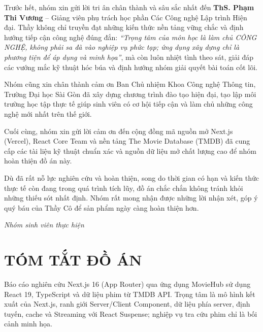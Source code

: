 \documentclass[12pt,a4paper]{extarticle}
\begin{document}
Trước hết, nhóm xin gửi lời tri ân chân thành và sâu sắc nhất đến \textbf{ThS. Phạm Thi Vương} -- Giảng viên phụ trách học phần Các Công nghệ Lập trình Hiện đại. Thầy không chỉ truyền đạt những kiến thức nền tảng vững chắc và định hướng tiếp cận công nghệ đúng đắn: \textit{``Trọng tâm của môn học là làm chủ CÔNG NGHỆ, không phải sa đà vào nghiệp vụ phức tạp; ứng dụng xây dựng chỉ là phương tiện để áp dụng và minh họa''}, mà còn luôn nhiệt tình theo sát, giải đáp các vướng mắc kỹ thuật hóc búa và định hướng nhóm giải quyết bài toán cốt lõi.

Nhóm cũng xin chân thành cảm ơn Ban Chủ nhiệm Khoa Công nghệ Thông tin, Trường Đại học Sài Gòn đã xây dựng chương trình đào tạo hiện đại, tạo lập môi trường học tập thực tế giúp sinh viên có cơ hội tiếp cận và làm chủ những công nghệ mới nhất trên thế giới.

Cuối cùng, nhóm xin gửi lời cảm ơn đến cộng đồng mã nguồn mở Next.js (Vercel), React Core Team và nền tảng The Movie Database (TMDB) đã cung cấp các tài liệu kỹ thuật chuẩn xác và nguồn dữ liệu mở chất lượng cao để nhóm hoàn thiện đồ án này.

Dù đã rất nỗ lực nghiên cứu và hoàn thiện, song do thời gian có hạn và kiến thức thực tế còn đang trong quá trình tích lũy, đồ án chắc chắn không tránh khỏi những thiếu sót nhất định. Nhóm rất mong nhận được những lời nhận xét, góp ý quý báu của Thầy Cô để sản phẩm ngày càng hoàn thiện hơn.

\vspace{1.5cm}
\begin{flushright}
    \textit{Nhóm sinh viên thực hiện}
\end{flushright}

\newpage

\section*{TÓM TẮT ĐỒ ÁN}
{}
Báo cáo nghiên cứu Next.js 16 (App Router) qua ứng dụng MovieHub sử dụng React 19, TypeScript và dữ liệu phim từ TMDB API. Trọng tâm là mô hình kết xuất của Next.js, ranh giới Server/Client Component, dữ liệu phía server, định tuyến, cache và Streaming với React Suspense; nghiệp vụ tra cứu phim chỉ là bối cảnh minh họa.
\end{document}
